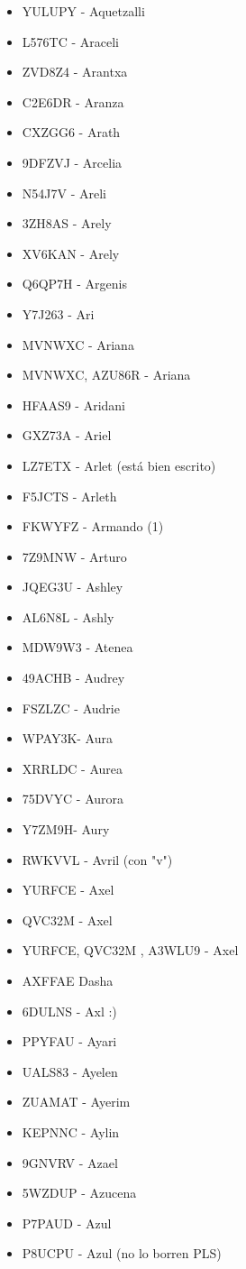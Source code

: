 \begin{itemize}[leftmargin=*,nosep]
\item YULUPY - Aquetzalli
\item L576TC - Araceli
\item ZVD8Z4 - Arantxa
\item C2E6DR - Aranza
\item CXZGG6 - Arath
\item 9DFZVJ - Arcelia
\item N54J7V - Areli
\item 3ZH8AS - Arely
\item XV6KAN - Arely
\item Q6QP7H - Argenis
\item Y7J263 - Ari
\item MVNWXC - Ariana
\item MVNWXC, AZU86R - Ariana
\item HFAAS9 - Aridani
\item GXZ73A - Ariel
\item LZ7ETX - Arlet (está bien escrito)
\item F5JCTS - Arleth
\item FKWYFZ - Armando (1)
\item 7Z9MNW - Arturo
\item JQEG3U - Ashley
\item AL6N8L - Ashly
\item MDW9W3 - Atenea
\item 49ACHB - Audrey
\item FSZLZC - Audrie
\item WPAY3K- Aura
\item XRRLDC - Aurea
\item 75DVYC - Aurora
\item Y7ZM9H- Aury
\item RWKVVL - Avril (con "v")
\item YURFCE - Axel
\item QVC32M - Axel
\item YURFCE, QVC32M , A3WLU9 - Axel
\item AXFFAE Dasha
\item 6DULNS - Axl :)
\item PPYFAU - Ayari
\item UALS83 - Ayelen
\item ZUAMAT - Ayerim
\item KEPNNC - Aylin
\item 9GNVRV - Azael
\item 5WZDUP - Azucena
\item P7PAUD - Azul
\item P8UCPU - Azul (no lo borren PLS)
\end{itemize}


